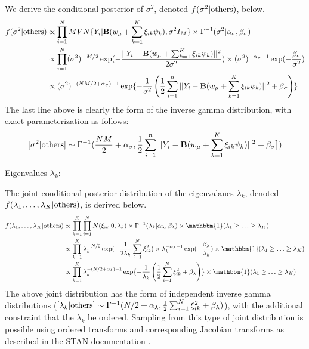 \documentclass[12pt]{article}
\begin{document}
We derive the conditional posterior of $\sigma^2$, denoted $f(\sigma^2|{\rm others})$, below.
\begin{align*}
    f(\sigma^2|{\rm others}) & \propto \prod_{i = 1}^N MVN\{Y_i|\mathbf{B}(w_{\mu} + \sum_{k = 1}^K \xi_{ik} \psi_{k}), \sigma^2 I_M\} \times \Gamma^{-1}(\sigma^2|\alpha_\sigma, \beta_\sigma)\\
    & \propto \prod_{i = 1}^N (\sigma^2)^{-M/2} \exp(-\frac{||Y_i - \mathbf{B}(w_{\mu} + \sum_{k = 1}^K \xi_{ik} \psi_{k})||^2}{2\sigma^2}) \times (\sigma^2)^{-\alpha_\sigma - 1}\exp(-\frac{\beta_\sigma}{\sigma^2})\\
    & \propto (\sigma^2)^{-(NM/2 + \alpha_\sigma) - 1} \exp\{-\frac{1}{\sigma^2}\left(\frac{1}{2}\sum_{i = 1}^n||Y_i - \mathbf{B}(w_\mu + \sum_{k = 1}^K \xi_{ik} \psi_k)||^2 + \beta_\sigma\right)\}
\end{align*}
The last line above is clearly the form of the inverse gamma distribution, with exact parameterization as follows:
$$[\sigma^2|{\rm others}] \sim \Gamma^{-1}(\frac{NM}{2} + \alpha_\sigma, \frac{1}{2}\sum_{i = 1}^n||Y_i - \mathbf{B}(w_\mu + \sum_{k = 1}^K \xi_{ik} \psi_k)||^2 + \beta_\sigma \bigr])$$

\vspace{0.5em}
\underline{Eigenvalues $\lambda_k$:}

The joint conditional posterior distribution of the eigenvalaues $\lambda_k$, denoted $f(\lambda_1,\ldots, \lambda_K|{\rm others})$, is derived below.
\begin{align*}
    f(\lambda_1,\ldots, \lambda_K|{\rm others}) & \propto \prod_{k = 1}^K \prod_{i = 1}^N N(\xi_{ik}|0, \lambda_k) \times \Gamma^{-1}(\lambda_k|\alpha_\lambda,\beta_\lambda) \times \mathbbm{1}(\lambda_1 \geq \ldots \geq \lambda_K) \\
    & \propto \prod_{k = 1}^K \lambda_k^{-N/2}\exp(-\frac{1}{2\lambda_k}\sum_{i = 1}^N \xi_{ik}^2)\times \lambda_k^{-\alpha_\lambda - 1} \exp(-\frac{\beta_\lambda}{\lambda_k}) \times \mathbbm{1}(\lambda_1 \geq \ldots \geq \lambda_K)\\
    & \propto \prod_{k = 1}^K \lambda_k^{-(N/2 + \alpha_\lambda) - 1} \exp\{-\frac{1}{\lambda_k}\left(\frac{1}{2}\sum_{i = 1}^N \xi_{ik}^2 + \beta_\lambda \right)\} \times \mathbbm{1}(\lambda_1 \geq \ldots \geq \lambda_K)
\end{align*}
The above joint distribution has the form of independent inverse gamma distributions ($[\lambda_k|{\rm others}] \sim \Gamma^{-1}(N/2 + \alpha_\lambda, \frac{1}{2}\sum_{i = 1}^N \xi_{ik}^2 + \beta_\lambda)$), with the additional constraint that the $\lambda_k$ be ordered. Sampling from this type of joint distribution is possible using ordered transforms and corresponding Jacobian transforms as described in the STAN documentation \citep{team_constraint}.
\end{document}
